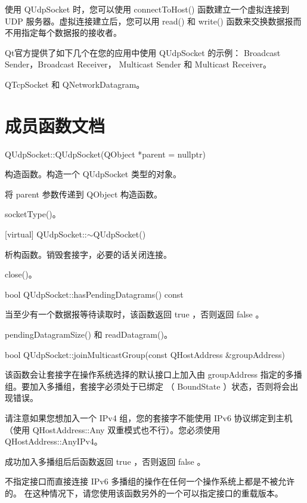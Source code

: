 使用 QUdpSocket 时，您可以使用 connectToHost() 函数建立一个虚拟连接到 UDP 服务器。虚拟连接建立后，您可以用 read() 和 write() 函数来交换数据报而不用指定每个数据报的接收者。

Qt官方提供了如下几个在您的应用中使用 QUdpSocket 的示例： Broadcast Sender，Broadcast Receiver， Multicast Sender 和 Multicast Receiver。

\begin{seeAlso}
QTcpSocket 和 QNetworkDatagram。
\end{seeAlso}

\section{成员函数文档}


QUdpSocket::QUdpSocket(QObject *parent = nullptr)

构造函数。构造一个 QUdpSocket 类型的对象。

将 parent 参数传递到 QObject 构造函数。

\begin{seeAlso}
socketType()。
\end{seeAlso}

[virtual] QUdpSocket::$\sim$QUdpSocket()

析构函数。销毁套接字，必要的话关闭连接。

\begin{seeAlso}
close()。
\end{seeAlso}

bool QUdpSocket::hasPendingDatagrams() const

当至少有一个数据报等待读取时，该函数返回 true ，否则返回 false 。

\begin{seeAlso}
pendingDatagramSize() 和 readDatagram()。
\end{seeAlso}

bool QUdpSocket::joinMulticastGroup(const QHostAddress \&groupAddress)

该函数会让套接字在操作系统选择的默认接口上加入由 groupAddress 指定的多播组。要加入多播组，套接字必须处于已绑定 （ BoundState ）状态，否则将会出现错误。

请注意如果您想加入一个 IPv4 组，您的套接字不能使用 IPv6 协议绑定到主机（使用 QHostAddress::Any 双重模式也不行）。您必须使用 QHostAddress::AnyIPv4。

成功加入多播组后后函数返回 true ，否则返回 false 。

\begin{notice}
不指定接口而直接连接 IPv6 多播组的操作在任何一个操作系统上都是不被允许的。
在这种情况下，请您使用该函数另外的一个可以指定接口的重载版本。
\end{notice}


